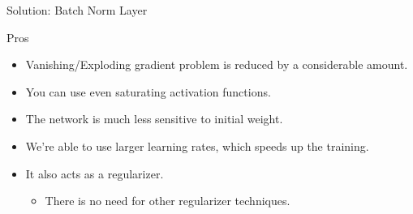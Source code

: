 \begin{frame}{Solution: Batch Norm Layer}
	\begin{block}{Pros}
		\begin{itemize}
			\item Vanishing/Exploding gradient problem is reduced by a considerable amount.
			\medskip
				\item You can use even saturating activation functions.
				\medskip
				\item The network is much less sensitive to initial weight.
				\medskip
				\item We're able to use larger learning rates, which speeds up the training.
			\medskip
			\item It also acts as a regularizer.
			\medskip
			\begin{itemize}
				\item There is no need for other regularizer techniques.
			\end{itemize}
		\end{itemize}
	\end{block}
\end{frame}

